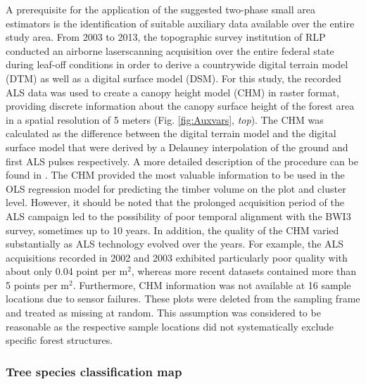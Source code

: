 \documentclass[remotesensing,article,submit,moreauthors,pdftex,10pt,a4paper]{mdpi}
\begin{document}
A prerequisite for the application of the suggested two-phase small area estimators is the identification of suitable auxiliary data available over the entire study area. From 2003 to 2013, the topographic survey institution of RLP conducted an airborne laserscanning acquisition over the entire federal state during leaf-off conditions in order to derive a countrywide digital terrain model (DTM) as well as a digital surface model (DSM). For this study, the recorded ALS data was used to create a canopy height model (CHM) in raster format, providing discrete information about the canopy surface height of the forest area in a spatial resolution of 5 meters (Fig. \ref{fig:Auxvars}, \textit{top}). The CHM was calculated as the difference between the digital terrain model and the digital surface model that were derived by a Delauney interpolation of the ground and first ALS pulses respectively. A more detailed description of the procedure can be found in \citet{hill2017a}. The CHM provided the most valuable information to be used in the OLS regression model for predicting the timber volume on the plot and cluster level. However, it should be noted that the prolonged acquisition period of the ALS campaign led to the possibility of poor temporal alignment with the BWI3 survey, sometimes up to 10 years. In addition, the quality of the CHM varied substantially as ALS technology evolved over the years.  For example, the ALS acquisitions recorded in 2002 and 2003 exhibited particularly poor quality with about only 0.04 point per m$^2$, whereas more recent datasets contained more than 5 points per m$^2$. Furthermore, CHM information was not available at 16 sample locations due to sensor failures. These plots were deleted from the sampling frame and treated as missing at random. This assumption was considered to be reasonable as the respective sample locations did not systematically exclude specific forest structures.

\subsubsection{Tree species classification map}
\label{sec:tspecclass}
\end{document}
